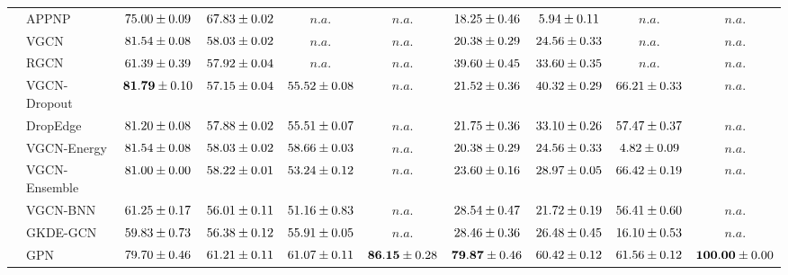 \begin{table*}[!h]
{\begin{tabular}{ll|cccc|cccc}
        \midrule
        
        & APPNP & ${75.00\tiny \pm 0.09}$ & ${{67.83}\tiny \pm 0.02}$ & $n.a.$ & $n.a.$ & ${18.25\tiny \pm 0.46}$ & ${5.94\tiny \pm 0.11}$ & $n.a.$ & $n.a.$\\
        & VGCN & ${81.54\tiny \pm 0.08}$ & ${58.03\tiny \pm 0.02}$ & $n.a.$ & $n.a.$ & ${20.38\tiny \pm 0.29}$ & ${24.56\tiny \pm 0.33}$ & $n.a.$ & $n.a.$\\
        & RGCN & ${61.39\tiny \pm 0.39}$ & ${57.92\tiny \pm 0.04}$ & $n.a.$ & $n.a.$ & ${39.60\tiny \pm 0.45}$ & ${33.60\tiny \pm 0.35}$ & $n.a.$ & $n.a.$\\
        & VGCN-Dropout & ${\mathbf{81.79}\tiny \pm 0.10}$ & ${57.15\tiny \pm 0.04}$ & ${55.52\tiny \pm 0.08}$ & $n.a.$ & ${21.52\tiny \pm 0.36}$ & ${40.32\tiny \pm 0.29}$ & ${66.21\tiny \pm 0.33}$ & $n.a.$\\
        & DropEdge & ${81.20\tiny \pm 0.08}$ & ${57.88\tiny \pm 0.02}$ & ${55.51\tiny \pm 0.07}$ & $n.a.$ & ${21.75\tiny \pm 0.36}$ & ${33.10\tiny \pm 0.26}$ & ${57.47\tiny \pm 0.37}$ & $n.a.$\\
        & VGCN-Energy & ${81.54\tiny \pm 0.08}$ & ${58.03\tiny \pm 0.02}$ & ${58.66\tiny \pm 0.03}$ & $n.a.$ & ${20.38\tiny \pm 0.29}$ & ${24.56\tiny \pm 0.33}$ & ${4.82\tiny \pm 0.09}$ & $n.a.$\\
        & VGCN-Ensemble & ${81.00\tiny \pm 0.00}$ & ${58.22\tiny \pm 0.01}$ & ${53.24\tiny \pm 0.12}$ & $n.a.$ & ${23.60\tiny \pm 0.16}$ & ${28.97\tiny \pm 0.05}$ & ${66.42\tiny \pm 0.19}$ & $n.a.$\\
        & VGCN-BNN & ${61.25\tiny \pm 0.17}$ & ${56.01\tiny \pm 0.11}$ & ${51.16\tiny \pm 0.83}$ & $n.a.$ & ${28.54\tiny \pm 0.47}$ & ${21.72\tiny \pm 0.19}$ & ${56.41\tiny \pm 0.60}$ & $n.a.$\\
        & GKDE-GCN & ${59.83\tiny \pm 0.73}$ & ${56.38\tiny \pm 0.12}$ & ${55.91\tiny \pm 0.05}$ & $n.a.$ & ${28.46\tiny \pm 0.36}$ & ${26.48\tiny \pm 0.45}$ & ${16.10\tiny \pm 0.53}$ & $n.a.$\\
        & GPN & ${79.70\tiny \pm 0.46}$ & ${61.21\tiny \pm 0.11}$ & ${{61.07}\tiny \pm 0.11}$ & ${\mathbf{86.15}\tiny \pm 0.28}$ & ${\mathbf{79.87}\tiny \pm 0.46}$ & ${{60.42}\tiny \pm 0.12}$ & ${61.56\tiny \pm 0.12}$ & ${\mathbf{100.00}\tiny \pm 0.00}$\\


\end{tabular}}
\end{table*}
